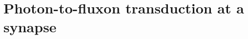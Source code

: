 \documentclass[twocolumn]{article}
\begin{document}
\section{\label{sec:synapse}Photon-to-fluxon transduction at a synapse}
\begin{figure} 
\end{figure}
\end{document}
